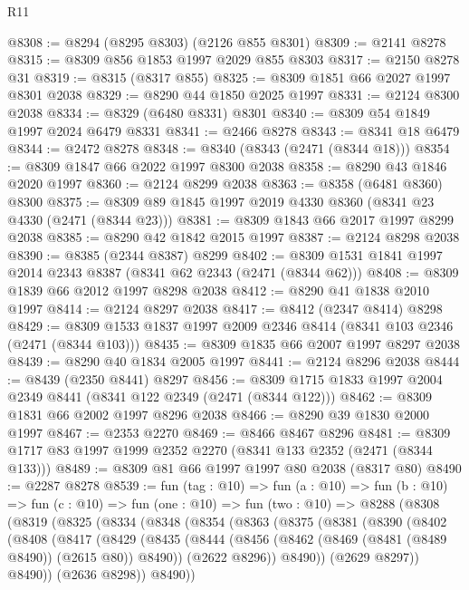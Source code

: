 \begin{lexlean}{R11}
\begin{coremodule}
@8308 := @8294 (@8295 @8303) (@2126 @855 @8301)
@8309 := @2141 @8278
@8315 := @8309 @856 @1853 @1997 @2029 @855 @8303
@8317 := @2150 @8278 @31
@8319 := @8315 (@8317 @855)
@8325 := @8309 @1851 @66 @2027 @1997 @8301 @2038
@8329 := @8290 @44 @1850 @2025 @1997
@8331 := @2124 @8300 @2038
@8334 := @8329 (@6480 @8331) @8301
@8340 := @8309 @54 @1849 @1997 @2024 @6479 @8331
@8341 := @2466 @8278
@8343 := @8341 @18 @6479
@8344 := @2472 @8278
@8348 := @8340 (@8343 (@2471 (@8344 @18)))
@8354 := @8309 @1847 @66 @2022 @1997 @8300 @2038
@8358 := @8290 @43 @1846 @2020 @1997
@8360 := @2124 @8299 @2038
@8363 := @8358 (@6481 @8360) @8300
@8375 := @8309 @89 @1845 @1997 @2019 @4330 @8360 (@8341 @23 @4330 (@2471 (@8344 @23)))
@8381 := @8309 @1843 @66 @2017 @1997 @8299 @2038
@8385 := @8290 @42 @1842 @2015 @1997
@8387 := @2124 @8298 @2038
@8390 := @8385 (@2344 @8387) @8299
@8402 := @8309 @1531 @1841 @1997 @2014 @2343 @8387 (@8341 @62 @2343 (@2471 (@8344 @62)))
@8408 := @8309 @1839 @66 @2012 @1997 @8298 @2038
@8412 := @8290 @41 @1838 @2010 @1997
@8414 := @2124 @8297 @2038
@8417 := @8412 (@2347 @8414) @8298
@8429 := @8309 @1533 @1837 @1997 @2009 @2346 @8414 (@8341 @103 @2346 (@2471 (@8344 @103)))
@8435 := @8309 @1835 @66 @2007 @1997 @8297 @2038
@8439 := @8290 @40 @1834 @2005 @1997
@8441 := @2124 @8296 @2038
@8444 := @8439 (@2350 @8441) @8297
@8456 := @8309 @1715 @1833 @1997 @2004 @2349 @8441 (@8341 @122 @2349 (@2471 (@8344 @122)))
@8462 := @8309 @1831 @66 @2002 @1997 @8296 @2038
@8466 := @8290 @39 @1830 @2000 @1997
@8467 := @2353 @2270
@8469 := @8466 @8467 @8296
@8481 := @8309 @1717 @83 @1997 @1999 @2352 @2270 (@8341 @133 @2352 (@2471 (@8344 @133)))
@8489 := @8309 @81 @66 @1997 @1997 @80 @2038 (@8317 @80)
@8490 := @2287 @8278
@8539 := fun (tag : @10) =>
  fun (a : @10) =>
  fun (b : @10) =>
  fun (c : @10) =>
  fun (one : @10) =>
  fun (two : @10) =>
  @8288
    (@8308
      (@8319
        (@8325
          (@8334
            (@8348
              (@8354
                (@8363
                  (@8375
                    (@8381
                      (@8390
                        (@8402
                          (@8408
                            (@8417
                              (@8429
                                (@8435
                                  (@8444
                                    (@8456 (@8462 (@8469 (@8481 (@8489 @8490)) (@2615 @80)) @8490))
                                    (@2622 @8296))
                                  @8490))
                              (@2629 @8297))
                            @8490))
                        (@2636 @8298))
                      @8490))

\end{coremodule}
\end{lexlean}
